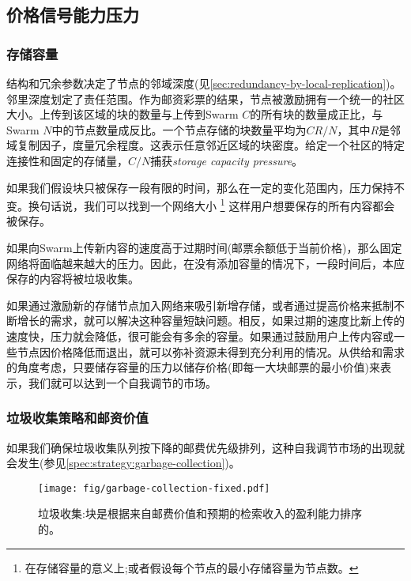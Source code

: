 \subsection{价格信号能力压力}\label{sec:capacity-pressure}

\yellow{}

\subsubsection{存储容量}
结构和冗余参数决定了节点的邻域深度(见\ref{sec:redundancy-by-local-replication})。邻里深度划定了责任范围。作为邮资彩票的结果，节点被激励拥有一个统一的社区大小。上传到该区域的块的数量与上传到Swarm $C$的所有块的数量成正比，与Swarm $N$中的节点数量成反比。一个节点存储的块数量平均为$CR/N$，其中$R$是邻域复制因子，度量冗余程度。这表示任意邻近区域的块密度。给定一个社区的特定连接性和固定的存储量，$C/N$捕获\emph{storage capacity pressure}。 

如果我们假设块只被保存一段有限的时间，那么在一定的变化范围内，压力保持不变。换句话说，我们可以找到一个网络大小%
%
\footnote{在存储容量的意义上;或者假设每个节点的最小存储容量为节点数。}
%
这样用户想要保存的所有内容都会被保存。 

如果向Swarm上传新内容的速度高于过期时间(邮票余额低于当前价格)，那么固定网络将面临越来越大的压力。因此，在没有添加容量的情况下，一段时间后，本应保存的内容将被垃圾收集。 

如果通过激励新的存储节点加入网络来吸引新增存储，或者通过提高价格来抵制不断增长的需求，就可以解决这种容量短缺问题。相反，如果过期的速度比新上传的速度快，压力就会降低，很可能会有多余的容量。如果通过鼓励用户上传内容或一些节点因价格降低而退出，就可以弥补资源未得到充分利用的情况。从供给和需求的角度考虑，只要储存容量的压力以储存价格(即每一大块邮票的最小价值)来表示，我们就可以达到一个自我调节的市场。 

\subsubsection{垃圾收集策略和邮资价值}

如果我们确保垃圾收集队列按下降的邮费优先级排列，这种自我调节市场的出现就会发生(参见\ref{spec:strategy:garbage-collection})。

\begin{figure}[htbp]
  \centering
  \texttt{[image: fig/garbage-collection-fixed.pdf]}
  \caption[垃圾收集\statusgreen]{垃圾收集:块是根据来自邮费价值和预期的检索收入的盈利能力排序的。}
  \label{fig:garbage-collection}
\end{figure}


